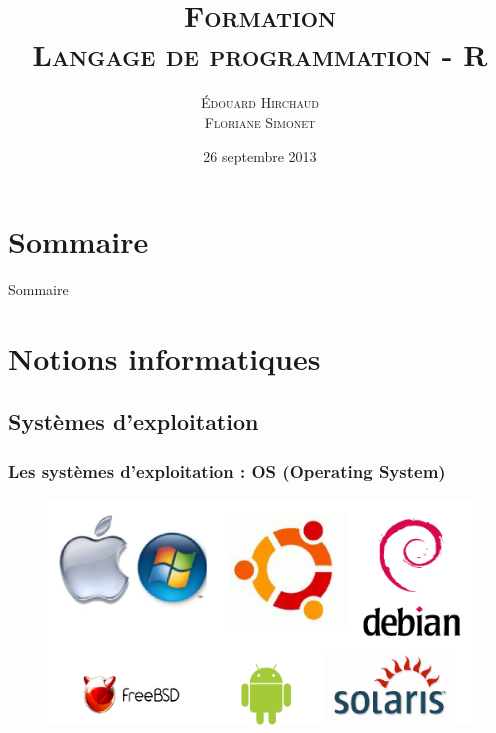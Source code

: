 \documentclass[handout, table,svgnames,hyperref={pdfpagemode=FullScreen}]{beamer}
\title{\textsc{Formation \\ Langage de programmation - R}}
\date{26 septembre 2013}
\author{\textsc{Édouard Hirchaud \\ Floriane Simonet}}
\begin{document}
\begin{frame}
	\maketitle
\end{frame}
	

\section*{Sommaire}
\begin{frame}{Sommaire}
	\small \tableofcontents
\end{frame}

\section{Notions informatiques}

\subsection{Systèmes d'exploitation}
\begin{frame}
	\frametitle{Les systèmes d'exploitation : OS (Operating System)}
	\begin{figure}
		\includegraphics[scale=0.55]{image/OSimage.png}
	\end{figure}
\end{frame}
\end{document}
